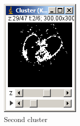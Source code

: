\documentclass[11pt]{article} %
\begin{document}
\begin{figure}
\begin{subfigure}[b]{0.3\textwidth}
                \includegraphics[width=\textwidth]{figures/k-means_results_2}
                \caption{Second cluster}
                \label{fig:k-means_res_2}
	\end{subfigure}%
	 ~
        \begin{subfigure}[b]{0.3\textwidth}
                \centering

\end{subfigure}
\end{figure}
\end{document}
